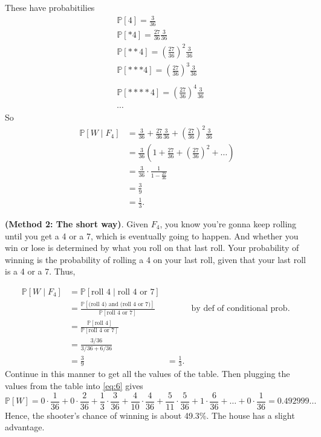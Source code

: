 \documentclass[10pt]{article}
\theoremstyle{definition}
\newcommand{\1}[1]{\textbf{1}_{\left[#1\right]}} %
\def\P{\mathbb{P}} %
\begin{document}
These have probabitilies
\begin{align*}
  &\P\left[4\right] = \frac{3}{36}\\ 
  &\P\left[*4\right] = \frac{27}{36} \frac{3}{36}\\
  &\P\left[**4\right] = \left( \frac{27}{36} \right)^{2} \frac{3}{36} \\
  &\P\left[***4\right]= \left( \frac{27}{36} \right)^{3} \frac{3}{36} \\\\
  &\P\left[****4\right] = \left( \frac{27}{36} \right)^{4} \frac{3}{36} \\\\
  &\cdots
\end{align*}
So
\begin{align*}
  \P\left[W\mid F_{4} \right] 
  &= \frac{3}{36}+ \frac{27}{36}\frac{3}{36}+ \left( \frac{27}{36} \right)^{2} \frac{3}{36} \\
  &= \frac{3}{36} \left( 1 + \frac{27}{36} + \left( \frac{27}{36} \right)^{2}+\ldots  \right) \\
  &= \frac{3}{36}\cdot \frac{1}{1-\frac{27}{36}} \\
  &= \frac{3}{9} \\
  &= \frac{1}{3}.
\end{align*}

\textbf{(Method 2: The short way)}. Given $F_{4}$, you know you're gonna keep rolling until you get a 4 or
a 7, which is eventually going to happen. And whether you win or lose is determined by what you roll on
that last roll. Your probability of winning is the probability of rolling a 4 on your last roll, given
that your last roll is a 4 or a 7. Thus,

\begin{align*}
  \P\left[W\mid F_{4} \right] 
  &= \P\left[ \text{roll 4} \mid \text{roll 4 or 7} \right] \\
  &= \frac{\P\left[ \text{(roll 4) and (roll 4 or 7)} \right]}{\P\left[ \text{roll 4 or 7} \right]}
  &&\text{by def of conditional prob. }\\
  &= \frac{\P\left[ \text{roll 4} \right]}{\P\left[\text{roll 4 or 7} \right]} \\
  &= \frac{3/36}{3/36+6/36}\\
  &= \frac{3}{9}
  &= \frac{1}{3}.
\end{align*}
Continue in this manner to get all the values of the table. Then plugging the values from the table into
\cref{eq:6} gives
\begin{equation*}
  \P\left[W \right] =
  0\cdot \frac{1}{36}
  + 0\cdot\frac{2}{36}
  + \frac{1}{3}\cdot\frac{3}{36}
  + \frac{4}{10}\cdot\frac{4}{36}
  + \frac{5}{11}\cdot\frac{5}{36}
  + 1\cdot\frac{6}{36}
  +\ldots
  + 0\cdot \frac{1}{36} = 0.492999...
\end{equation*}
Hence, the shooter's chance of winning is about 49.3\%. The house has a slight advantage.
\end{document}
